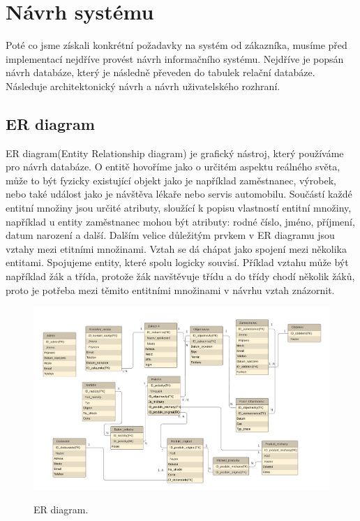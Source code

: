 \newpage



\chapter{Návrh systému}
\label{navrh}

Poté co jsme získali konkrétní požadavky na systém od zákazníka, musíme před implementací nejdříve provést návrh informačního systému. Nejdříve je popsán návrh databáze, který je následně převeden do tabulek relační databáze. Následuje architektonický návrh a návrh uživatelského rozhraní.

\section{ER diagram}
ER diagram(Entity Relationship diagram) je grafický nástroj, který používáme pro návrh databáze. O entitě hovoříme jako o určitém aspektu reálného světa, může to být fyzicky existující objekt jako je například zaměstnanec, výrobek, nebo také událost jako je návštěva lékaře nebo servis automobilu. Součástí každé entitní množiny jsou určité atributy, sloužící k popisu vlastností entitní množiny, například u entity zaměstnanec mohou být atributy: rodné číslo, jméno, příjmení, datum narození a další. Dalším velice důležitým prvkem v ER diagramu jsou vztahy mezi etitními množinami. Vztah se dá chápat jako spojení mezi několika entitami. Spojujeme entity, které spolu logicky souvisí. \cite{erdia} Příklad vztahu může být například žák a třída, protože žák navštěvuje třídu a do třídy chodí několik žáků, proto je potřeba mezi těmito entitními množinami v návrhu vztah znázornit.


\newpage

\begin{figure}[H]
    \centering
    \includegraphics[width=220mm, angle=90]{obrazky-figures/erdiagram.png}
    \\
    \caption{ER diagram.}
\end{figure}

